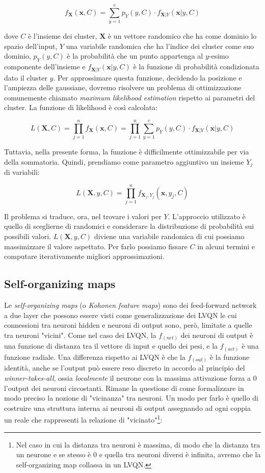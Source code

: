 \documentclass[10pt,a4paper]{article}
\begin{document}
$$
f_\mathbf{X} (\mathbf{x},C) = \sum^c_{y = 1} p_Y(y,C) \cdot f_{\mathbf{X}|Y}(\mathbf{x}|y,C)
$$

dove $C$ è l'insieme dei cluster, $\mathbf{X}$ è un vettore randomico che ha come dominio lo spazio dell'input, $Y$ una variabile randomica che ha l'indice dei cluster come suo dominio, $p_Y(y,C)$ è la probabilità che un punto appartenga al $y$-esimo componente dell'insieme e $f_{\mathbf{X}|Y}(\mathbf{x}|y,C)$ è la funzione di probabilità condizionata dato il cluster $y$.
Per approssimare questa funzione, decidendo la posizione e l'ampiezza delle gaussiane, dovremo risolvere un problema di ottimizzazione comunemente chiamato \emph{maximum likelihood estimation} rispetto ai parametri del cluster. La funzione di likelihood è così calcolata:

$$
L(\mathbf{X},C) = \prod_{j=1}^n f_\mathbf{X} (\mathbf{x},C) = \prod_{j=1}^n \sum^c_{y = 1} p_Y(y,C) \cdot f_{\mathbf{X}|Y}(\mathbf{x}|y,C)
$$

Tuttavia, nella presente forma, la funzione è difficilmente ottimizzabile per via della sommatoria. Quindi, prendiamo come parametro aggiuntivo un insieme $Y_j$ di variabili:

$$
L(\mathbf{X},y,C) = \prod_{j=1}^n f_{\mathbf{X}_j,Y_j} (\mathbf{x},y_j,C)
$$

Il problema si traduce, ora, nel trovare i valori per $Y$. L'approccio utilizzato è quello di sceglierne di randomici e considerare la distribuzione di probabilità sui possibili valori. $L(\mathbf{X},y,C)$ diviene una variabile randomica di cui possiamo massimizzare il valore aspettato. Per farlo possiamo fissare $C$ in alcuni termini e computare iterativamente migliori approssimazioni.

\subsection{Self-organizing maps}

Le \emph{self-organizing maps} (o \emph{Kohonen feature maps}) sono dei feed-forward network a due layer che possono essere visti come generalizzazione dei LVQN le cui connessioni tra neuroni hidden e neuroni di output sono, però, limitate a quelle tra neuroni "vicini". Come nel caso dei LVQN, la $f_{(net)}$ dei neuroni di output è una funzione di distanza tra il vettore di input e quello dei pesi, e la $f_{(act)}$ è una funzione radiale. Una differenza rispetto ai LVQN è che la $f_{(out)}$ è la funzione identità, anche se l'output può essere reso discreto in accordo al principio del \emph{winner-takes-all}, ossia \emph{localmente} il neurone con la massima attivazione forza a 0 l'output dei neuroni circostanti. Rimane la questione di come formalizzare in modo preciso la nozione di "vicinanza" tra neuroni. Un modo per farlo è quello di costruire una struttura interna ai neuroni di output assegnando ad ogni coppia un reale che rappresenti la relazione di "vicinato"\footnote{Nel caso in cui la distanza tra neuroni è massima, di modo che la distanza tra un neurone e se stesso è 0 e quella tra neuroni diversi è infinita, avremo che la self-organizing map collassa in un LVQN.}:
\end{document}
